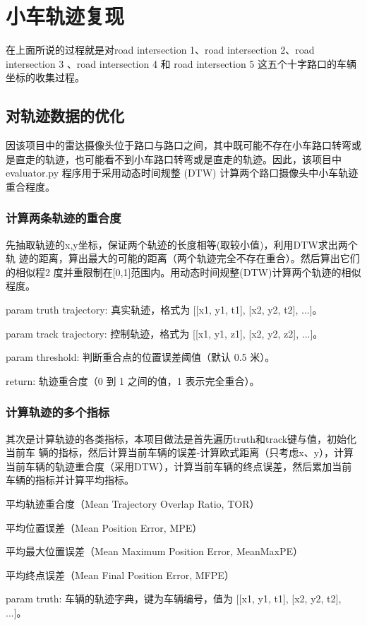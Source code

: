 \section{小车轨迹复现}

在上面所说的过程就是对road intersection 1、road intersection 2、road intersection 3 、road intersection 4 和 road intersection 5 这五个十字路口的车辆坐标的收集过程。


\subsection{对轨迹数据的优化}
因该项目中的雷达摄像头位于路口与路口之间，其中既可能不存在小车路口转弯或是直走的轨迹，也可能看不到小车路口转弯或是直走的轨迹。因此，该项目中 evaluator.py 程序用于采用动态时间规整 (DTW) 计算两个路口摄像头中小车轨迹重合程度。
\subsubsection{计算两条轨迹的重合度}
先抽取轨迹的x,y坐标，保证两个轨迹的长度相等(取较小值)，利用DTW求出两个轨  迹的距离，算出最大的可能的距离（两个轨迹完全不存在重合）。然后算出它们的相似程2 度并重限制在[0,1]范围内。用动态时间规整(DTW)计算两个轨迹的相似程度。

param truth trajectory: 真实轨迹，格式为 [[x1, y1, t1], [x2, y2, t2], ...]。

param track trajectory: 控制轨迹，格式为 [[x1, y1, z1], [x2, y2, z2], ...]。

param threshold: 判断重合点的位置误差阈值（默认 0.5 米）。

return: 轨迹重合度（0 到 1 之间的值，1 表示完全重合）。

\subsubsection{计算轨迹的多个指标}
其次是计算轨迹的各类指标，本项目做法是首先遍历truth和track键与值，初始化当前车 辆的指标，然后计算当前车辆的误差-计算欧式距离（只考虑x、y），计算当前车辆的轨迹重合度（采用DTW），计算当前车辆的终点误差，然后累加当前车辆的指标并计算平均指标。

平均轨迹重合度（Mean Trajectory Overlap Ratio, TOR）

平均位置误差（Mean Position Error, MPE）

平均最大位置误差（Mean Maximum Position Error, MeanMaxPE）

平均终点误差（Mean Final Position Error, MFPE）

param truth: 车辆的轨迹字典，键为车辆编号，值为 [[x1, y1, t1], [x2, y2, t2], ...]。

